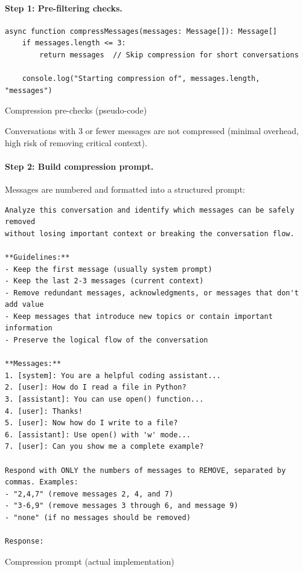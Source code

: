 \documentclass[english]{article}
\begin{document}
\paragraph{Step 1: Pre-filtering checks.}

\begin{listing}[H]
\begin{verbatim}
async function compressMessages(messages: Message[]): Message[]
    if messages.length <= 3:
        return messages  // Skip compression for short conversations

    console.log("Starting compression of", messages.length, "messages")
\end{verbatim}
\caption{Compression pre-checks (pseudo-code)}
\end{listing}

Conversations with 3 or fewer messages are not compressed (minimal overhead, high risk of removing critical context).

\paragraph{Step 2: Build compression prompt.}

Messages are numbered and formatted into a structured prompt:

\begin{listing}[H]
\begin{verbatim}
Analyze this conversation and identify which messages can be safely removed
without losing important context or breaking the conversation flow.

**Guidelines:**
- Keep the first message (usually system prompt)
- Keep the last 2-3 messages (current context)
- Remove redundant messages, acknowledgments, or messages that don't add value
- Keep messages that introduce new topics or contain important information
- Preserve the logical flow of the conversation

**Messages:**
1. [system]: You are a helpful coding assistant...
2. [user]: How do I read a file in Python?
3. [assistant]: You can use open() function...
4. [user]: Thanks!
5. [user]: Now how do I write to a file?
6. [assistant]: Use open() with 'w' mode...
7. [user]: Can you show me a complete example?

Respond with ONLY the numbers of messages to REMOVE, separated by commas. Examples:
- "2,4,7" (remove messages 2, 4, and 7)
- "3-6,9" (remove messages 3 through 6, and message 9)
- "none" (if no messages should be removed)

Response:
\end{verbatim}
\caption{Compression prompt (actual implementation)}
\end{listing}
\end{document}
